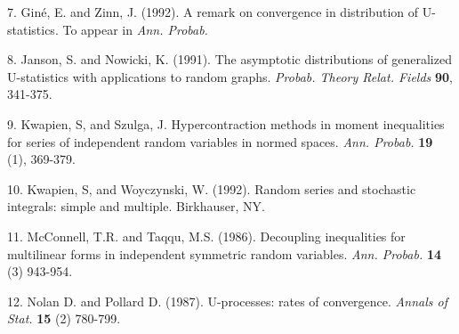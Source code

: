 \item{7.} Gin\'e, E. and Zinn, J. (1992). A remark on convergence in
distribution of U-statistics. To appear in {\it Ann. Probab.}

\item{8.} Janson, S. and Nowicki, K. (1991). The asymptotic distributions of 
generalized U-statistics with applications to random graphs.
{\it Probab. Theory Relat. Fields} {\bf 90}, 341-375.

\item{9.} Kwapien, S, and Szulga, J. Hypercontraction methods in
moment inequalities for series of independent random variables in
normed spaces. {\it Ann. Probab.} {\bf 19} (1), 369-379.

\item {10.} Kwapien, S, and Woyczynski, W. (1992). 
Random series and stochastic
integrals: simple and multiple. Birkhauser, NY.

\item {11.} McConnell, T.R. and Taqqu, M.S. (1986).  Decoupling inequalities
for multilinear forms in independent symmetric random variables.
{\it Ann. Probab.} {\bf 14} (3) 943-954.

\item{12.} Nolan D. and Pollard D. (1987). U-processes: rates of convergence.
{\it Annals of Stat.} {\bf 15} (2) 780-799.



